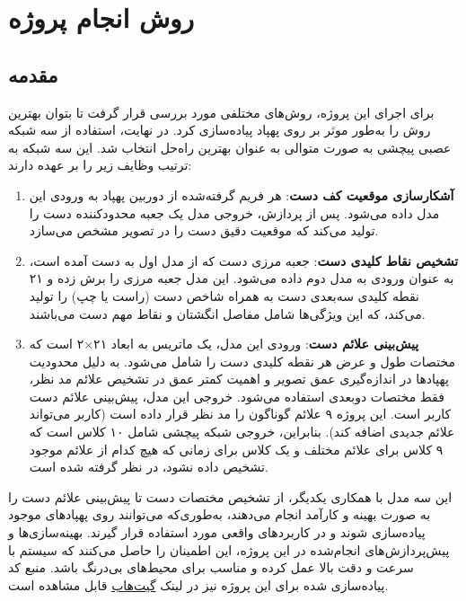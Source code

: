 \chapter{روش انجام پروژه}
\section{مقدمه}
برای اجرای این پروژه، روش‌های مختلفی مورد بررسی قرار گرفت تا بتوان بهترین روش را به‌طور موثر  بر روی پهپاد پیاده‌سازی کرد. در نهایت، استفاده از سه شبکه عصبی پیچشی به صورت متوالی به عنوان بهترین راه‌حل انتخاب شد. این سه شبکه به ترتیب وظایف زیر را بر عهده دارند:

\begin{enumerate}
    \item \textbf{آشکارسازی موقعیت کف دست}: هر فریم گرفته‌شده از دوربین پهپاد به ورودی این مدل داده می‌شود. پس از پردازش، خروجی مدل یک جعبه محدودکننده  دست را تولید می‌کند که موقعیت دقیق دست را در تصویر مشخص می‌سازد.
    
    \item \textbf{تشخیص نقاط کلیدی دست}: جعبه مرزی دست که از مدل اول به دست آمده است، به عنوان ورودی به مدل دوم داده می‌شود. این مدل جعبه مرزی را برش زده و ۲۱ نقطه کلیدی سه‌بعدی دست به همراه شاخص دست (راست یا چپ) را تولید می‌کند، که این ویژگی‌ها شامل مفاصل انگشتان و نقاط مهم دست می‌باشند.
    
    \item \textbf{پیش‌بینی علائم دست}: ورودی این مدل، یک ماتریس به ابعاد ۲۱×۲ است که مختصات طول و عرض هر نقطه کلیدی دست را شامل می‌شود. به دلیل محدودیت پهپادها در اندازه‌گیری عمق تصویر و اهمیت کمتر عمق
     در تشخیص علائم مد نظر، فقط مختصات دوبعدی استفاده می‌شود. خروجی این مدل، پیش‌بینی علائم دست کاربر است. این پروژه ۹ علائم گوناگون را مد نظر قرار داده است (کاربر می‌تواند علائم‌ جدیدی اضافه کند). بنابراین، خروجی شبکه پیچشی شامل ۱۰ کلاس است که ۹ کلاس برای علائم مختلف و یک کلاس برای زمانی که هیچ کدام از علائم موجود تشخیص داده نشود، در نظر گرفته شده است.
\end{enumerate}

این سه مدل با همکاری یکدیگر، از تشخیص  مختصات دست تا پیش‌بینی علائم دست را به صورت بهینه و کارآمد انجام می‌دهند، به‌طوری‌که می‌توانند روی پهپادهای موجود پیاده‌سازی شوند و در کاربردهای واقعی مورد استفاده قرار گیرند. بهینه‌سازی‌ها و پیش‌پردازش‌های انجام‌شده در این پروژه،  این اطمینان را حاصل می‌کنند که سیستم با سرعت و دقت بالا عمل کرده و مناسب برای محیط‌های بی‌درنگ باشد.
منبع کد پیاده‌سازی شده برای این پروژه نیز در لینک \href{https://github.com/sara-tajernia/hand-gesture-control_drone}{گیت‌هاب} قابل مشاهده است.

